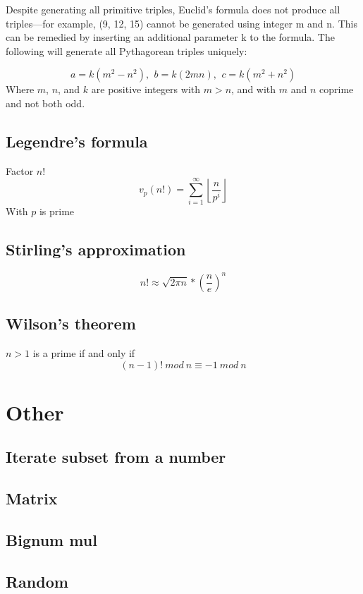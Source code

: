 \documentclass[a4paper, 12pt, oneside, landscape]{article}
\begin{document}
\begin{multicols}{2}
	Despite generating all primitive triples, Euclid's formula does not produce all triples—for example, (9, 12, 15) cannot be generated using integer m and n. This can be remedied by inserting an additional parameter k to the formula. The following will generate all Pythagorean triples uniquely:

    \[a=k (m^{2}-n^{2}),\ \,b=k (2mn),\ \,c=k (m^{2}+n^{2}) \]
    Where $m$, $n$, and $k$ are positive integers with $m > n$, and with $m$ and $n$ coprime and not both odd.
	
	\subsection{Legendre's formula}
	Factor $n!$
	\[v_p(n!) = \sum_{i = 1}^{\infty} \left \lfloor \frac{n}{p ^ i} \right \rfloor \]
	With $p$ is prime
	
	\subsection{Stirling's approximation}
	\[n! \approx \sqrt{2\pi n} * (\frac{n}{e}) ^ n\]
	
	\subsection{Wilson's theorem}
	$n > 1$ is a prime if and only if 
	\[ (n - 1)! \ mod \ n \equiv -1 \ mod \ n \]

\section{Other}
    \subsection{Iterate subset from a number}
    

    \subsection{Matrix}
    

	\subsection{Bignum mul}
	
	
	\subsection{Random}
	
	

\end{multicols}
\end{document}
